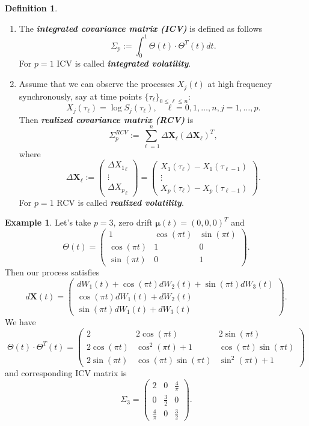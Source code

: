 \documentclass[a4paper,11pt]{article}
\theoremstyle{plain}
\theoremstyle{definition}
\newtheorem{defn}[thm]{Definition}
\newtheorem{exmp}[thm]{Example}
\newcommand{\define}[1]{\textit{\textbf{#1}}}
\begin{document}
	\begin{defn} \
		\begin{enumerate}
			\item The \define{integrated covariance matrix (ICV)} is defined as follows
			\[\Sigma_p := \int_0^1\Theta(t) \cdot \Theta^T(t) dt.\]
			For $p=1$ ICV is called \define{integrated volatility}.
			\item Assume that we can observe the processes $X_j(t)$ at high frequency synchronously, say at time points $ \{\tau_\ell\}_{0 \leq \ell \leq n}$:
			\[ X_j(\tau_\ell) = \log S_j(\tau_\ell), \quad \ell = 0, 1, \dots, n, j = 1, \dots, p. \]
			 Then \define{realized covariance matrix (RCV)} is
			\begin{equation} \label{RCV}
				\Sigma_p^{RCV} := \sum_{\ell=1}^{n}\Delta \mathbf{X}_\ell(\Delta \mathbf{X}_\ell)^T,
			\end{equation}
			where 
			\[ \Delta \mathbf{X}_\ell :=
			\begin{pmatrix}
			\Delta {X_1}_\ell \\
			\vdots \\
			\Delta {X_p}_\ell
			\end{pmatrix}
			=
			\begin{pmatrix}
			X_1(\tau_{\ell}) - X_1(\tau_{\ell-1}) \\
			\vdots \\
			X_p(\tau_{\ell}) - X_p(\tau_{\ell-1})
			\end{pmatrix}. \]
			For $p=1$ RCV is called \define{realized volatility}.
		\end{enumerate}
	\end{defn}
	
	\begin{exmp} \label{exmp X3}
	    Let's take $p = 3$, zero drift $\boldsymbol{\mu}(t) = (0, 0, 0)^T$ and 
		\[ \Theta(t) = \begin{pmatrix}
		1 & \cos(\pi t) & \sin (\pi t) \\
		\cos(\pi t) & 1 & 0 \\
		\sin (\pi t) & 0 & 1
		\end{pmatrix}. \]
		Then our process satisfies
		\[ d\mathbf{X}(t) = \begin{pmatrix}
		dW_1(t)+\cos(\pi t) dW_2(t) +\sin(\pi t)dW_3(t)  \\
	    \cos(\pi t) dW_1(t) + dW_2(t) \\
		\sin(\pi t) dW_1(t)+ dW_3(t)
		\end{pmatrix}. \]
		We have
		\[ \Theta(t) \cdot \Theta^T(t) = \begin{pmatrix}
		2 & 2\cos(\pi t) & 2\sin (\pi t) \\
		2\cos(\pi t) & \cos^2(\pi t) + 1 & \cos(\pi t)\sin(\pi t) \\
		2\sin (\pi t) & \cos(\pi t)\sin(\pi t) & \sin^2(\pi t)+1
		\end{pmatrix} \]
		and corresponding ICV matrix is
		\[ \Sigma_3 = \begin{pmatrix}
		2 & 0 & \frac{4}{\pi} \\
		0 & \frac{3}{2} & 0 \\
		\frac{4}{\pi} & 0 & \frac{3}{2}
		\end{pmatrix}. \]
	\end{exmp}
	
\end{document}
